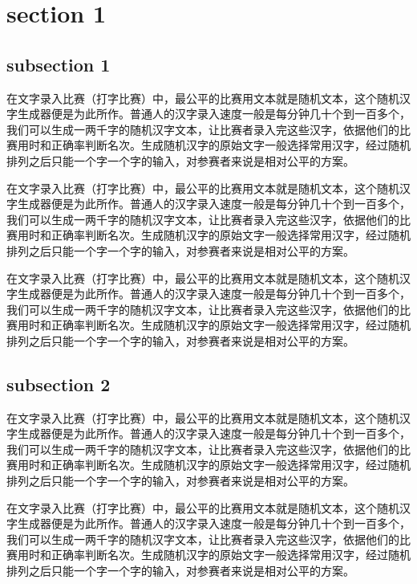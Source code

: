 \documentclass[12pt,hyperref,UTF8]{ctexbook}
\begin{document}
\section{section 1}

\subsection{subsection 1}

在文字录入比赛（打字比赛）中，最公平的比赛用文本就是随机文本，这个随机汉字生成器便是为此所作。普通人的汉字录入速度一般是每分钟几十个到一百多个，我们可以生成一两千字的随机汉字文本，让比赛者录入完这些汉字，依据他们的比赛用时和正确率判断名次。生成随机汉字的原始文字一般选择常用汉字，经过随机排列之后只能一个字一个字的输入，对参赛者来说是相对公平的方案。

在文字录入比赛（打字比赛）中，最公平的比赛用文本就是随机文本，这个随机汉字生成器便是为此所作。普通人的汉字录入速度一般是每分钟几十个到一百多个，我们可以生成一两千字的随机汉字文本，让比赛者录入完这些汉字，依据他们的比赛用时和正确率判断名次。生成随机汉字的原始文字一般选择常用汉字，经过随机排列之后只能一个字一个字的输入，对参赛者来说是相对公平的方案。

在文字录入比赛（打字比赛）中，最公平的比赛用文本就是随机文本，这个随机汉字生成器便是为此所作。普通人的汉字录入速度一般是每分钟几十个到一百多个，我们可以生成一两千字的随机汉字文本，让比赛者录入完这些汉字，依据他们的比赛用时和正确率判断名次。生成随机汉字的原始文字一般选择常用汉字，经过随机排列之后只能一个字一个字的输入，对参赛者来说是相对公平的方案。

\subsection{subsection 2}

在文字录入比赛（打字比赛）中，最公平的比赛用文本就是随机文本，这个随机汉字生成器便是为此所作。普通人的汉字录入速度一般是每分钟几十个到一百多个，我们可以生成一两千字的随机汉字文本，让比赛者录入完这些汉字，依据他们的比赛用时和正确率判断名次。生成随机汉字的原始文字一般选择常用汉字，经过随机排列之后只能一个字一个字的输入，对参赛者来说是相对公平的方案。

在文字录入比赛（打字比赛）中，最公平的比赛用文本就是随机文本，这个随机汉字生成器便是为此所作。普通人的汉字录入速度一般是每分钟几十个到一百多个，我们可以生成一两千字的随机汉字文本，让比赛者录入完这些汉字，依据他们的比赛用时和正确率判断名次。生成随机汉字的原始文字一般选择常用汉字，经过随机排列之后只能一个字一个字的输入，对参赛者来说是相对公平的方案。
\end{document}
